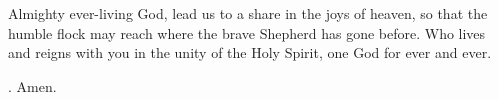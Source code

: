 \lettrine[lines=3]{A}{}lmighty ever-living God,
lead us to a share in the joys of heaven,
so that the humble flock may reach
where the brave Shepherd has gone before.
Who lives and reigns with you in the unity of the Holy Spirit,
one God for ever and ever.
\par \Rbar. Amen.
